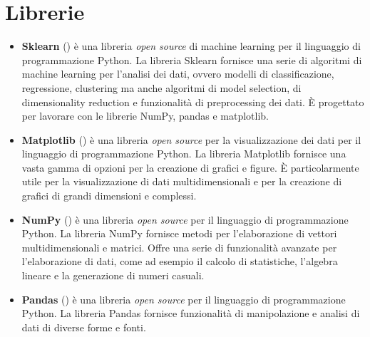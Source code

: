 \section{Librerie}\label{cap:importPy}
\begin{itemize}
	\item \textbf{Sklearn} (\textit{\cite{sklearn}}) è una libreria \emph{open source} di machine learning per il linguaggio di programmazione Python. La libreria Sklearn fornisce una serie di algoritmi di machine learning per l'analisi dei dati, ovvero modelli di classificazione, regressione, clustering ma anche algoritmi di model selection, di dimensionality reduction e funzionalità di preprocessing dei dati. È progettato per lavorare con le librerie NumPy, pandas e matplotlib.
	\item \textbf{Matplotlib} (\textit{\cite{matplotlib}}) è una libreria \emph{open source} per la visualizzazione dei dati per il linguaggio di programmazione Python. La libreria Matplotlib fornisce una vasta gamma di opzioni per la creazione di grafici e figure. È particolarmente utile per la visualizzazione di dati multidimensionali e per la creazione di grafici di grandi dimensioni e complessi. 
	\item \textbf{NumPy} (\textit{\cite{numPy}}) è una libreria \emph{open source} per il linguaggio di programmazione Python. La libreria NumPy fornisce metodi per l'elaborazione di vettori multidimensionali e matrici. Offre una serie di funzionalità avanzate per l'elaborazione di dati, come ad esempio il calcolo di statistiche, l'algebra lineare e la generazione di numeri casuali. 
	\item \textbf{Pandas} (\textit{\cite{pandas}}) è una libreria \emph{open source} per il linguaggio di programmazione Python. La libreria Pandas fornisce funzionalità di manipolazione e analisi di dati di diverse forme e fonti.
\end{itemize}